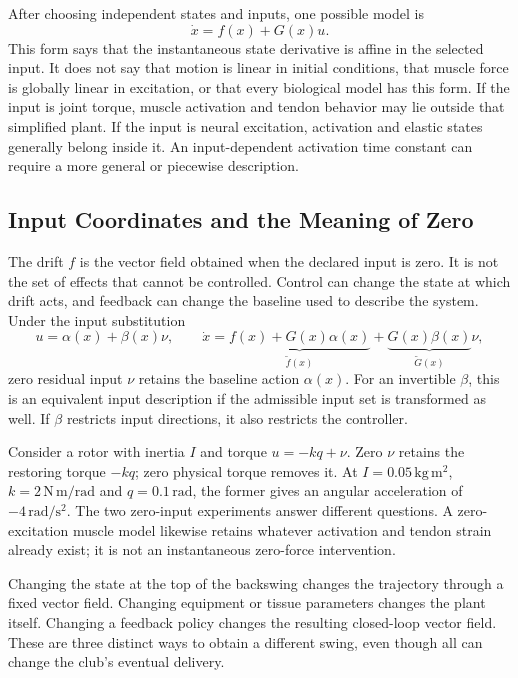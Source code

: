 After choosing independent states and inputs, one possible model is
\[
\dot x=f(x)+G(x)u.
\]
This form says that the instantaneous state derivative is affine in the selected input. It does not say that motion is linear in initial conditions, that muscle force is globally linear in excitation, or that every biological model has this form. If the input is joint torque, muscle activation and tendon behavior may lie outside that simplified plant. If the input is neural excitation, activation and elastic states generally belong inside it. An input-dependent activation time constant can require a more general or piecewise description.

\subsection{Input Coordinates and the Meaning of Zero}

The drift $f$ is the vector field obtained when the declared input is zero. It is not the set of effects that cannot be controlled. Control can change the state at which drift acts, and feedback can change the baseline used to describe the system. Under the input substitution
\[
u=\alpha(x)+\beta(x)\nu,
\qquad
\dot x=\underbrace{f(x)+G(x)\alpha(x)}_{\widetilde f(x)}
       +\underbrace{G(x)\beta(x)}_{\widetilde G(x)}\nu,
\]
zero residual input $\nu$ retains the baseline action $\alpha(x)$. For an invertible $\beta$, this is an equivalent input description if the admissible input set is transformed as well. If $\beta$ restricts input directions, it also restricts the controller.

Consider a rotor with inertia $I$ and torque $u=-kq+\nu$. Zero $\nu$ retains the restoring torque $-kq$; zero physical torque removes it. At $I=0.05\,\mathrm{kg\,m^2}$, $k=2\,\mathrm{N\,m/rad}$ and $q=0.1\,\mathrm{rad}$, the former gives an angular acceleration of $-4\,\mathrm{rad/s^2}$. The two zero-input experiments answer different questions. A zero-excitation muscle model likewise retains whatever activation and tendon strain already exist; it is not an instantaneous zero-force intervention.

Changing the state at the top of the backswing changes the trajectory through a fixed vector field. Changing equipment or tissue parameters changes the plant itself. Changing a feedback policy changes the resulting closed-loop vector field. These are three distinct ways to obtain a different swing, even though all can change the club's eventual delivery.

